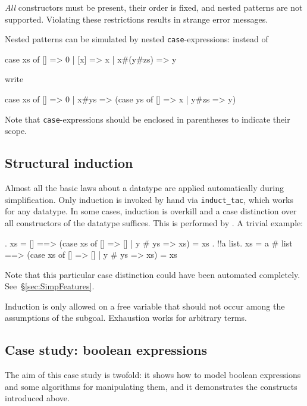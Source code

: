 \begin{warn}
{\em All} constructors must be present, their order is fixed, and nested
patterns are not supported.  Violating these restrictions results in strange
error messages.
\end{warn}
\noindent
Nested patterns can be simulated by nested \texttt{case}-expressions: instead
of
\begin{ttbox}
case xs of [] => 0 | [x] => x | x#(y#zs) => y
\end{ttbox}
write
\begin{ttbox}
case xs of [] => 0 | x#ys => (case ys of [] => x | y#zs => y)
\end{ttbox}
Note that \texttt{case}-expressions should be enclosed in parentheses to
indicate their scope.

\subsection{Structural induction}

Almost all the basic laws about a datatype are applied automatically during
simplification. Only induction is invoked by hand via \texttt{induct_tac},
which works for any datatype. In some cases, induction is overkill and a case
distinction over all constructors of the datatype suffices. This is performed
by . A trivial example:
\begin{ttbox}
{. xs = [] ==> (case xs of [] => [] | y # ys => xs) = xs}
{. !!a list. xs = a # list ==> (case xs of [] => [] | y # ys => xs) = xs}
\end{ttbox}
Note that this particular case distinction could have been automated
completely. See~\S\ref{sec:SimpFeatures}.

\begin{warn}
  Induction is only allowed on a free variable that should not occur among
  the assumptions of the subgoal.  Exhaustion works for arbitrary terms.
\end{warn}

\subsection{Case study: boolean expressions}
\label{sec:boolex}

The aim of this case study is twofold: it shows how to model boolean
expressions and some algorithms for manipulating them, and it demonstrates
the constructs introduced above.

